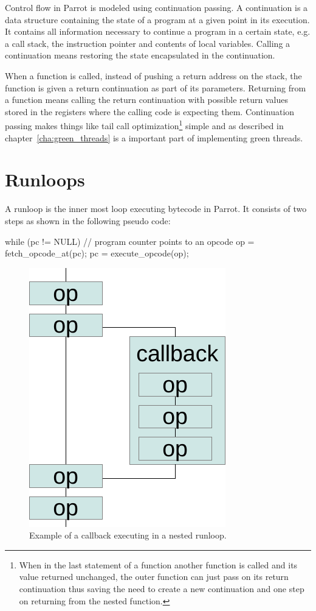 \documentclass[bachelor,english]{hgbthesis}
\begin{document}
Control flow in Parrot is modeled using continuation passing. A continuation is a data structure containing the state of a program at a given point in its execution. It contains all information necessary to continue a program in a certain state, e.g. a call stack, the instruction pointer and contents of local variables. Calling a continuation means restoring the state encapsulated in the continuation.

When a function is called, instead of pushing a return address on the stack, the function is given a return continuation as part of its parameters. Returning from a function means calling the return continuation with possible return values stored in the registers where the calling code is expecting them. Continuation passing makes things like tail call optimization\footnote{When in the last statement of a function another function is called and its value returned unchanged, the outer function can just pass on its return continuation thus saving the need to create a new continuation and one step on returning from the nested function.} simple and as described in chapter~\ref{cha:green_threads} is a important part of implementing green threads.

\section{Runloops}
\label{sec:Runloops}

A runloop is the inner most loop executing bytecode in Parrot. It consists of two steps as shown in the following pseudo code:
\begin{GenericCode}
while (pc != NULL) { // program counter points to an opcode
    op = fetch_opcode_at(pc);
    pc = execute_opcode(op);
}
\end{GenericCode}

\begin{figure}
\centering
\includegraphics[scale=.4]{runloops}
\caption{Example of a callback executing in a nested runloop.}
\label{fig:runloops}
\end{figure}
\end{document}
